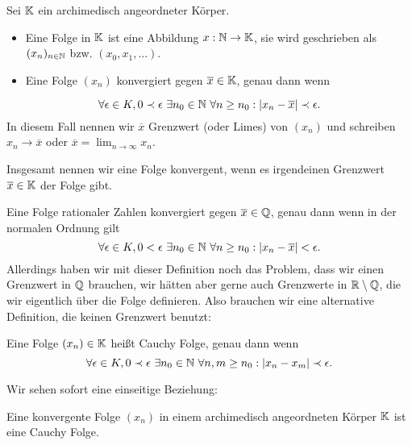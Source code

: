 \begin{emphBox}{}{}
\begin{definition}{}{}
Sei \(\mathbb{K}\) ein archimedisch angeordneter Körper.
\begin{itemize}
\item {} 
Eine Folge in \(\mathbb{K}\) ist eine Abbildung \(x: \mathbb{N} \rightarrow \mathbb{K}\), sie wird geschrieben als \((x_n)_{n \in \mathbb{N}}\) bzw.
\((x_0,x_1,\ldots)\).

\item {} 
Eine Folge \((x_n)\) konvergiert gegen \(\overline{x} \in \mathbb{K}\), genau dann wenn

\end{itemize}
\begin{equation*}
 \forall \epsilon \in K, 0 \prec \epsilon ~ \exists n_0 \in \mathbb{N} ~\forall n \geq n_0: |x_n - \overline{x}| \prec \epsilon.
\end{equation*}
In diesem Fall nennen wir \(\overline{x}\) Grenzwert (oder Limes) von \((x_n)\) und schreiben \(x_n \rightarrow \overline{x}\) oder \(\overline{x}= \lim_{n \rightarrow \infty} x_n. \)

Insgesamt nennen wir eine Folge konvergent, wenn es irgendeinen Grenzwert \(\overline{x} \in \mathbb{K}\) der Folge gibt.
\end{definition}
\end{emphBox}

Eine Folge rationaler Zahlen konvergiert gegen \(\overline{x} \in \mathbb{Q}\), genau dann wenn in der normalen Ordnung gilt
\begin{equation*}
 \forall \epsilon \in K, 0 < \epsilon ~ \exists n_0 \in \mathbb{N} ~\forall n \geq n_0: |x_n - \overline{x}| < \epsilon.
\end{equation*}
Allerdings haben wir mit dieser Definition noch das Problem, dass wir einen Grenzwert in \(\mathbb{Q}\) brauchen, wir hätten aber gerne auch Grenzwerte in \(\mathbb{R} \setminus \mathbb{Q}\), die wir eigentlich über die Folge definieren. Also brauchen wir eine alternative Definition, die keinen Grenzwert benutzt:
\label{grundlagen/zahlensysteme:definition-14}
\begin{definition}{}{}



Eine Folge \((x_n) \in \mathbb{K}\) heißt Cauchy Folge, genau dann wenn
\begin{equation*}
 \forall \epsilon \in K, 0 \prec \epsilon ~ \exists n_0 \in \mathbb{N} ~\forall n,m  \geq n_0: |x_n - x_m| \prec \epsilon.
\end{equation*}\end{definition}

Wir sehen sofort eine einseitige Beziehung:
\label{grundlagen/zahlensysteme:theorem-15}
\begin{theorem}{}{}



Eine konvergente Folge \((x_n)\) in einem archimedisch angeordneten Körper \(\mathbb{K}\) ist eine Cauchy Folge.
\end{theorem}

